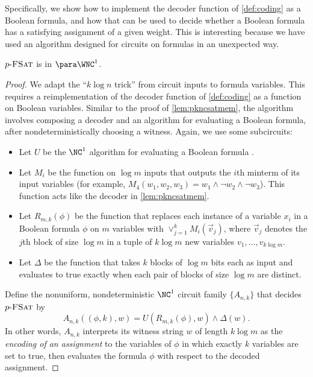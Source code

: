 %
%
%
%
Specifically, we show how to implement the decoder function of \autoref{def:coding} as a Boolean formula, and how that can be used to decide whether a Boolean formula has a satisfying assignment of a given weight.
%
%
%
This is interesting because we have used an algorithm designed for circuits on formulas in an unexpected way.
%
%

\begin{lemma}\label{lem:pfsatmem}
  $p \textnormal{-} \textsc{FSat}$ is in $\para \WNC^1$.
\end{lemma}
\begin{proof}
  We adapt the ``$k \log n$ trick'' from circuit inputs to formula variables.
  This requires a reimplementation of the decoder function of \autoref{def:coding} as a function on Boolean variables.
  Similar to the proof of \autoref{lem:pkncsatmem}, the algorithm involves composing a decoder and an algorithm for evaluating a Boolean formula, after nondeterministically choosing a witness.
  Again, we use some subcircuits:
  \begin{itemize}
  \item Let $U$ be the $\NC^1$ algorithm for evaluating a Boolean formula \autocites{buss87, bcgr92}.
  \item
    Let $M_i$ be the function on $\log m$ inputs that outputs the $i$th minterm of its input variables (for example, $M_4(w_1, w_2, w_3) = w_1 \land \lnot w_2 \land \lnot w_3$).
    This function acts like the decoder in \autoref{lem:pkncsatmem}.
  \item
    Let $R_{m, k}(\phi)$ be the function that replaces each instance of a variable $x_i$ in a Boolean formula $\phi$ on $m$ variables with $\vee_{j = 1}^k M_i(\vec{v}_j)$, where $\vec{v}_j$ denotes the $j$th block of size $\log m$ in a tuple of $k \log m$ new variables $v_1, \dotsc, v_{k \log m}$.
  \item Let $\Delta$ be the function that takes $k$ blocks of $\log m$ bits each as input and evaluates to true exactly when each pair of blocks of size $\log m$ are distinct.
  \end{itemize}
  Define the nonuniform, nondeterministic $\NC^1$ circuit family $\{A_{n, k}\}$ that decides $p \textnormal{-} \textsc{FSat}$ by
  \[
  A_{n, k}((\phi, k), w) = U(R_{m, k}(\phi), w) \land \Delta(w).
  \]
  In other words, $A_{n, k}$ interprets its witness string $w$ of length $k \log m$ as the \emph{encoding of an assignment} to the variables of $\phi$ in which exactly $k$ variables are set to true, then evaluates the formula $\phi$ with respect to the decoded assignment.


\end{proof}
